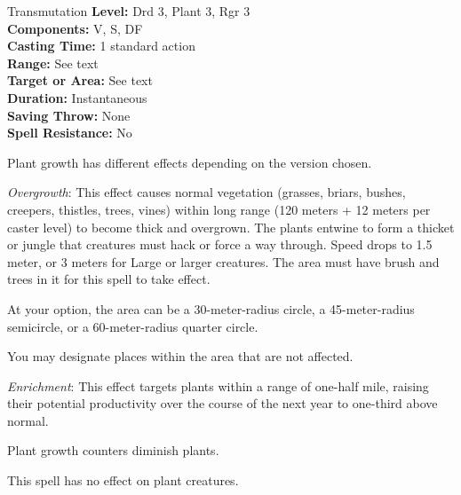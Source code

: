 {Transmutation}
{
	\textbf{Level:}
	Drd 3, Plant 3, Rgr 3\\
	\textbf{Components:}
	V, S, DF\\
	\textbf{Casting Time:}
	1 standard action\\
	\textbf{Range:}
	See text\\
	\textbf{Target or Area:}
	See text\\
	\textbf{Duration:}
	Instantaneous\\
	\textbf{Saving Throw:}
	None\\
	\textbf{Spell Resistance:}
	No\\
}
{
	Plant growth has different effects depending on the version chosen.

	\textit{Overgrowth}:
	This effect causes normal vegetation (grasses, briars, bushes, creepers, thistles, trees, vines) within long range (120 meters + 12 meters per caster level) to become thick and overgrown. The plants entwine to form a thicket or jungle that creatures must hack or force a way through. Speed drops to 1.5 meter, or 3 meters for Large or larger creatures. The area must have brush and trees in it for this spell to take effect.

	At your option, the area can be a 30-meter-radius circle, a 45-meter-radius semicircle, or a 60-meter-radius quarter circle.

	You may designate places within the area that are not affected.

	\textit{Enrichment}:
	This effect targets plants within a range of one-half mile, raising their potential productivity over the course of the next year to one-third above normal.

	Plant growth counters diminish plants.

	This spell has no effect on plant creatures.

}
